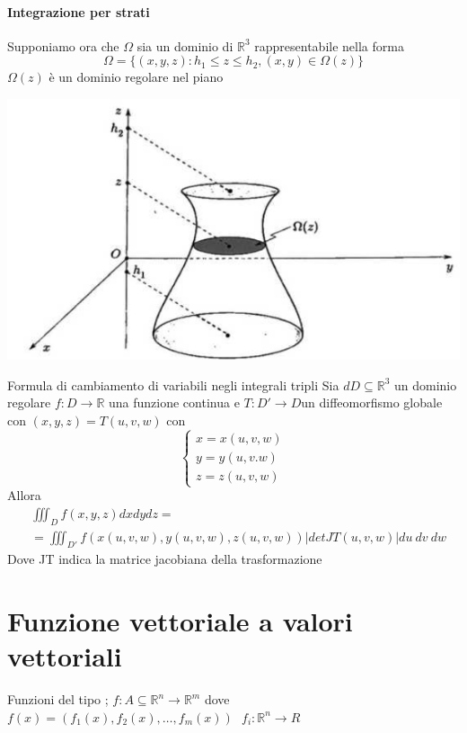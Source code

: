 \documentclass{article}
\theoremstyle{definition}
\newcommand{\R}{\mathbb{R}}
\newcommand{\Rn}{\R^n}
\begin{document}
	\paragraph{Integrazione per strati}
	Supponiamo ora che $\Omega$ sia un dominio di $\R^3$ rappresentabile nella forma $$\Omega=\{(x,y,z):h_1\leq z \leq h_2 , (x,y)\in \Omega(z)\}$$  $\Omega(z)$ è un dominio regolare nel piano 
	\begin{center}
		\includegraphics[scale=0.40]{immagini/Screenshot 2024-11-21 at 16.59.38.png}
	\end{center}
	\begin{teo}{Formula di cambiamento di variabili negli integrali tripli }{}
		Sia $d D \subseteq\R^3$ un dominio regolare $f:D\rightarrow \R$ una funzione continua e $T:D'\rightarrow D $un diffeomorfismo globale con  $(x,y,z)=T(u,v,w) $  con $$\begin{cases}
			x=x(u,v,w)\\
			y=y(u,v.w)\\
			z=z(u,v,w)
		\end{cases}$$
		Allora \begin{align*}
			& \iiint_Df(x,y,z)dxdydz= \\
			&=\iiint_{D'}f(x(u,v,w),y(u,v,w),z(u,v,w))|detJT(u,v,w)|du\ dv\ dw
		\end{align*}
		Dove JT indica la matrice jacobiana della trasformazione
	\end{teo}
	\section{Funzione vettoriale a valori vettoriali}
	Funzioni del tipo ; $f: A \subseteq \Rn \rightarrow \R^m$ dove $f(x)=(f_1(x),f_2(x),\dots,f_m(x)) \ \ \ f_i : \Rn \rightarrow R$
	
\end{document}
